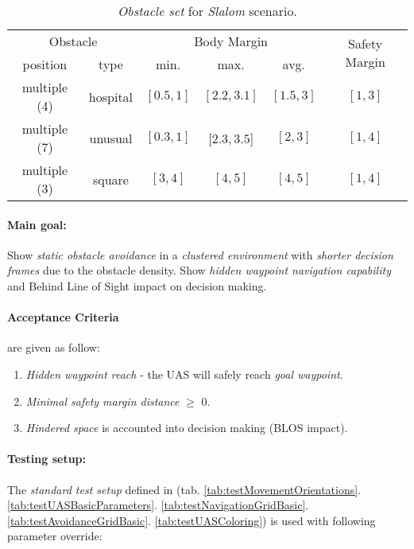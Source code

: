 \begin{table}[H]
    \centering
    \begin{tabular}{c|c|c|c|c|c}
        \multicolumn{2}{c|}{Obstacle} & \multicolumn{3}{c|}{Body Margin} & \multirow{2}{*}{Safety Margin}\\\cline{1-5}
        position & type & min. & max. & avg. &   \\\hline\hline
        multiple (4) & hospital & $[0.5,1]$ & $[2.2,3.1]$ & $[1.5,3]$  & $[1,3]$ \\\hline 
        multiple (7) & unusual  & $[0.3,1]$ & $[2.3,3.5$] & $[2,3]$  & $[1,4]$ \\\hline
        multiple (3) & square   & $[3,4]$   & $[4,5]$     & $[4,5]$ & $[1,4]$   \\
     \end{tabular}
    \caption{\emph{Obstacle set} for \emph{Slalom} scenario.}
    \label{tab:obstacleSetSlalom}
\end{table}

\paragraph{Main goal:} Show \emph{static obstacle avoidance} in a \emph{clustered environment} with \emph{shorter decision frames} due to the obstacle density. Show \emph{hidden waypoint navigation capability} and Behind Line of Sight impact on decision making. 

\newpage
\paragraph{Acceptance Criteria} are given as follow: 
\begin{enumerate}
    \item \emph{Hidden waypoint reach} - the UAS will safely reach \emph{goal waypoint}.
    \item \emph{Minimal safety margin distance} $\ge$ 0.
    \item \emph{Hindered space} is accounted into decision making (BLOS impact).
\end{enumerate}

\paragraph{Testing setup:}  The \emph{standard test setup} defined in (tab.  \ref{tab:testMovementOrientations}. \ref{tab:testUASBasicParameters}. \ref{tab:testNavigationGridBasic}. \ref{tab:testAvoidanceGridBasic}. \ref{tab:testUASColoring}) is used with following parameter override:


